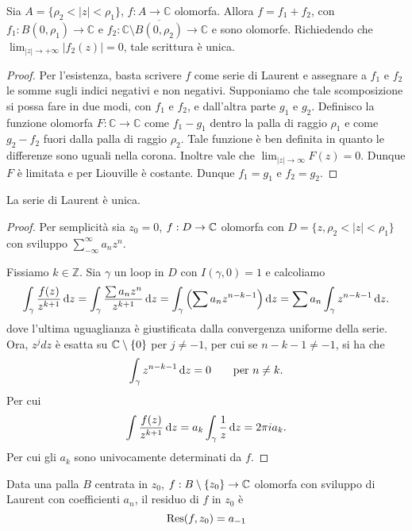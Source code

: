 \begin{cor}
    Sia $A = \{\rho_2<|z|<\rho_1\}$, $f:A\rightarrow \mathbb{C}$ olomorfa.
    Allora $f = f_1 + f_2$, con $f_1:B(0,\rho_1)\rightarrow\mathbb{C}$ e $f_2:
    \mathbb{C}\setminus \overline{B(0,\rho_2)}\rightarrow\mathbb{C}$ e sono
    olomorfe. Richiedendo che $\lim_{|z|\rightarrow +\infty} |f_2(z)| = 0$,
    tale scrittura \`e unica.
\end{cor}
\begin{proof}
    Per l'esistenza, basta scrivere $f$ come serie di Laurent e assegnare a
    $f_1$ e $f_2$ le somme sugli indici negativi e non negativi.
    Supponiamo che tale scomposizione si possa fare in due modi, con $f_1$ e
    $f_2$, e dall'altra parte $g_1$ e $g_2$.
    Definisco la funzione olomorfa $F:\mathbb{C}\rightarrow\mathbb{C}$ come
    $f_1-g_1$ dentro la palla di raggio $\rho_1$ e come $g_2-f_2$ fuori dalla
    palla di raggio $\rho_2$. Tale funzione \`e ben definita in quanto le
    differenze sono uguali nella corona. Inoltre vale che $\lim_{|z|\rightarrow
    \infty} F(z) = 0$. Dunque $F$ \`e limitata e per Liouville \`e costante.
    Dunque $f_1=g_1$ e $f_2 = g_2$.
\end{proof}

\begin{thm}
    La serie di Laurent \`e unica.
\end{thm}
\begin{proof}
    Per semplicit\`a sia $z_0=0$, $f:D\rightarrow\mathbb{C}$ olomorfa con $D = \{z,
    \rho_2<|z|<\rho_1\}$ con sviluppo $\sum_{-\infty}^\infty a_nz^n$.

    Fissiamo $k\in\mathbb{Z}$. Sia $\gamma$ un loop in $D$ con $I(\gamma,0)=1$ e
    calcoliamo
    \[
        \int_\gamma \frac{f(z)}{z^{k+1}}\mathop{}\!\mathrm{d} z =
        \int_\gamma \frac{\sum a_nz^n}{z^{k+1}}\mathop{}\!\mathrm{d} z =
        \int_\gamma \left(\sum a_nz^{n-k-1}\right)\mathop{}\!\mathrm{d} z =
        \sum a_n \int_\gamma z^{n-k-1}\mathop{}\!\mathrm{d} z.
    \]
    dove l'ultima uguaglianza \`e giustificata dalla convergenza uniforme della
    serie.
    Ora, $z^jdz$ \`e esatta su $\mathbb{C}\setminus\{0\}$ per $j\neq -1$, per cui se
    $n-k-1\neq -1$, si ha che
    \[
        \int_\gamma z^{n-k-1}\mathop{}\!\mathrm{d} z = 0 \qquad \text{per $n\neq k$}.
    \]
    Per cui
    \[
        \int\frac{f(z)}{z^{k+1}}\mathop{}\!\mathrm{d} z = a_k \int_\gamma\frac{1}{z}\mathop{}\!\mathrm{d} z = 2\pi i a_k.
    \]
    Per cui gli $a_k$ sono univocamente determinati da $f$.
\end{proof}

\begin{defn}
    Data una palla $B$ centrata in $z_0$, $f:B\setminus\{z_0\}\rightarrow\mathbb{C}$
    olomorfa con sviluppo di Laurent con coefficienti $a_n$, il residuo di $f$
    in $z_0$ \`e
    \[
        \text{Res}(f,z_0)=a_{-1}
    \]
\end{defn}
